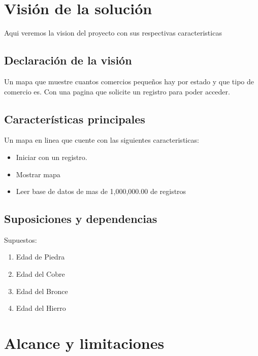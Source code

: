 \documentclass[12pt]{article}
\begin{document}
\newpage
\maketitle

\newpage \tableofcontents

\newpage \section{Visión de la solución}

Aqui veremos la vision del proyecto con sus respectivas caracteristicas
 
\subsection{Declaración de la visión}\label{ant}

Un mapa que muestre cuantos comercios pequeños hay por estado y que tipo de comercio es. Con una 
pagina que solicite un registro para poder acceder.

\subsection{Características principales}\label{on}

Un mapa en linea que cuente con las siguientes caracteristicas:
\begin{itemize}

\item Iniciar con un registro.        
\item Mostrar mapa 
\item Leer base de datos de mas de 1,000,000.00 de registros

\end{itemize}

\subsection{Suposiciones y dependencias}\label{occe}

Supuestos:
\begin{enumerate}
        \item Edad de Piedra
        \item Edad del Cobre
        \item Edad del Bronce
        \item Edad del Hierro
\end{enumerate}
\section{Alcance y limitaciones}
\end{document}
